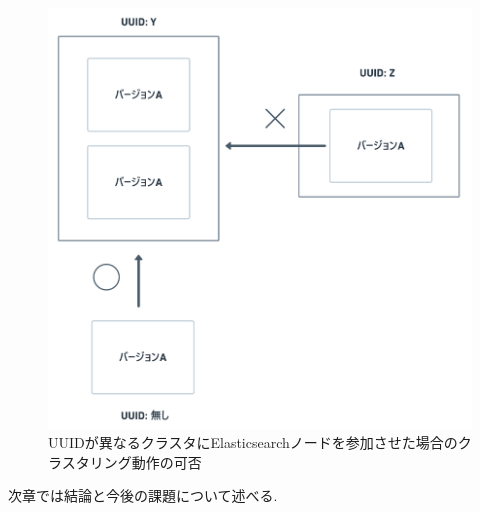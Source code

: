 \begin{figure}[H]
  \begin{center}
    \includegraphics[width=140mm]{sotu/figure/youshi-4.png}
    \caption{UUIDが異なるクラスタにElasticsearchノードを参加させた場合のクラスタリング動作の可否}
    \label{4-p17}
  \end{center}
\end{figure}

次章では結論と今後の課題について述べる.

